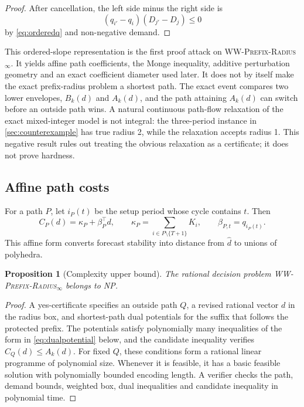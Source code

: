 \documentclass[11pt]{article}
\newtheorem{proposition}[theorem]{Proposition}
\theoremstyle{definition}
\newcommand{\WWR}{\textsc{WW-Prefix-Radius}\ensuremath{_{\infty}}}
\newcommand{\dhat}{\widehat d}
\begin{document}
\begin{proof}
After cancellation, the left side minus the right side is
\[
(q_{i'}-q_i)(D_{j'}-D_j)\le0
\]
by \eqref{eq:orderedq} and non-negative demand.
\end{proof}

This ordered-slope representation is the first proof attack on \WWR. It yields affine path coefficients, the Monge inequality, additive perturbation geometry and an exact coefficient diameter used later. It does not by itself make the exact prefix-radius problem a shortest path. The exact event compares two lower envelopes, $B_k(d)$ and $A_k(d)$, and the path attaining $A_k(d)$ can switch before an outside path wins. A natural continuous path-flow relaxation of the exact mixed-integer model is not integral: the three-period instance in \cref{sec:counterexample} has true radius 2, while the relaxation accepts radius 1. This negative result rules out treating the obvious relaxation as a certificate; it does not prove hardness.

\subsection{Affine path costs}

For a path $P$, let $i_P(t)$ be the setup period whose cycle contains $t$. Then
\begin{equation}\label{eq:affinepath}
C_P(d)=\kappa_P+\beta_P^\top d,
\qquad
\kappa_P=\sum_{i\in P\setminus\{T+1\}}K_i,
\qquad
\beta_{P,t}=q_{i_P(t)}.
\end{equation}
This affine form converts forecast stability into distance from $\dhat$ to unions of polyhedra.

\begin{proposition}[Complexity upper bound]\label{prop:np}
The rational decision problem \WWR{} belongs to NP.
\end{proposition}

\begin{proof}
A yes-certificate specifies an outside path $Q$, a revised rational vector $d$ in the radius box, and shortest-path dual potentials for the suffix that follows the protected prefix. The potentials satisfy polynomially many inequalities of the form in \eqref{eq:dualpotential} below, and the candidate inequality verifies $C_Q(d)\le A_k(d)$. For fixed $Q$, these conditions form a rational linear programme of polynomial size. Whenever it is feasible, it has a basic feasible solution with polynomially bounded encoding length. A verifier checks the path, demand bounds, weighted box, dual inequalities and candidate inequality in polynomial time.
\end{proof}
\end{document}

